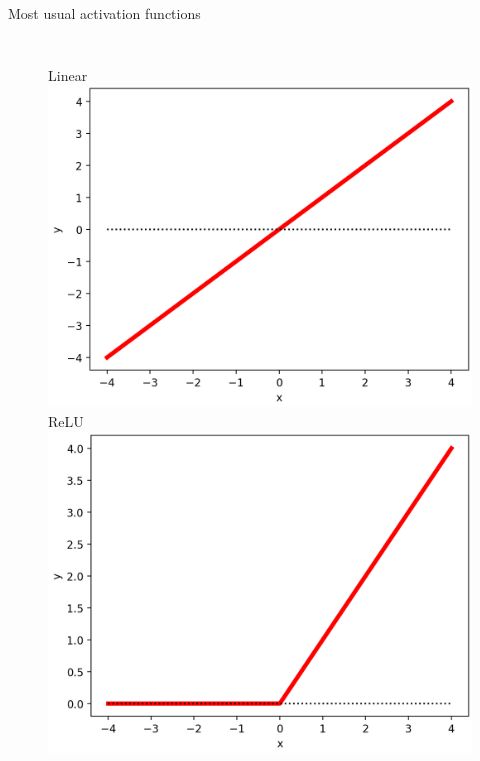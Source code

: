 \documentclass[handout]{beamer}
\begin{document}
\begin{frame}{Most usual activation functions}
\begin{columns}
    \begin{figure}
        \centering
        Linear\\
        \includegraphics[width=.85\textwidth]{fig/L2/activ-linear.png}\\
        ReLU\\
        \includegraphics[width=.85\textwidth]{fig/L2/activ-relu.png}\\


\end{figure}
\end{columns}
\end{frame}
\end{document}
